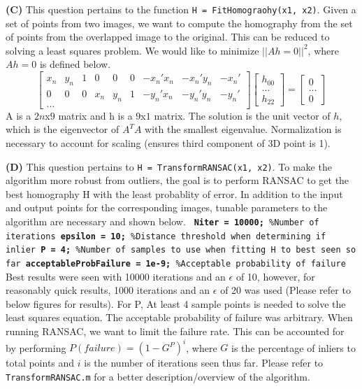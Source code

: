 \documentclass[12pt,twoside]{article}
\begin{document}
\textbf{(C)} This question pertains to the function \texttt{H = FitHomograohy(x1, x2)}. Given a set of points from two images, we want to compute the homography from the set of points from the overlapped image to the original.  This can be reduced to solving a least squares problem.  We would like to minimize $||Ah = 0||^{2}$, where $Ah=0$ is defined below.\newline
$$
\begin{bmatrix}
x_n & y_n & 1 & 0 & 0 & 0 & -x_{n}'x_{n} & -x_{n}'y_{n} & -x_{n}' \\[0.3em]
0 & 0 & 0 & x_n & y_n & 1 & -y_{n}'x_{n} & -y_{n}'y_{n} & -y_{n}' \\[0.3em]
...
\end{bmatrix}
\begin{bmatrix}
h_{00} \\[0.3em]
... \\[0.3em]
h_{22}
\end{bmatrix}
=
\begin{bmatrix}
0 \\[0.3em]
... \\[0.3em]
0
\end{bmatrix}
$$
\newline
A is a $2n$x$9$ matrix and h is a $9$x$1$ matrix.  The solution is the unit vector of $h$, which is the eigenvector of $A^{T}A$ with the smallest eigenvalue. Normalization is necessary to account for scaling (ensures third component of 3D point is 1).\newline

\textbf{(D)} This question pertains to \texttt{H = TransformRANSAC(x1, x2)}.  To make the algorithm more robust from outliers, the goal is to perform RANSAC to get the best homography H with the least probablity of error.  In addition to the input and output points for the corresponding images, tunable parameters to the algorithm are necessary and shown below.\newline\newline
\texttt{
\textbf{Niter = 10000;}      \%Number of iterations\newline
\textbf{epsilon = 10;}       \%Distance threshold when determining if inlier\newline 
\textbf{P = 4;}              \%Number of samples to use when fitting H to best seen so far\newline
\textbf{acceptableProbFailure = 1e-9;}   \%Acceptable probability of failure\newline
}
\newline
Best results were seen with 10000 iterations and an $\epsilon$ of 10, however, for reasonably quick results, 1000 iterations and an $\epsilon$ of 20 was used (Please refer to below figures for results).  For P, At least 4 sample points is needed to solve the least squares equation.  The acceptable probability of failure was arbitrary.  When running RANSAC, we want to limit the failure rate.  This can be accounted for by performing $P(failure) = (1-G^P)^i$, where $G$ is the percentage of inliers to total points and $i$ is the number of iterations seen thus far.  Please refer to \texttt{TransformRANSAC.m} for a better description/overview of the algorithm.\newline
\end{document}
